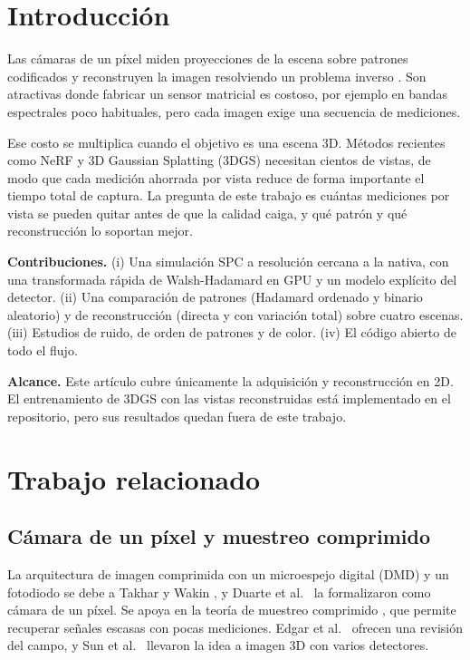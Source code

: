 \documentclass[conference]{IEEEtran}
\begin{document}
\section{Introducción}
Las cámaras de un píxel miden proyecciones de la escena sobre patrones codificados y reconstruyen la imagen resolviendo
un problema inverso \cite{duarte2008,edgar2019}. Son atractivas donde fabricar un sensor matricial es costoso, por
ejemplo en bandas espectrales poco habituales, pero cada imagen exige una secuencia de mediciones.

Ese costo se multiplica cuando el objetivo es una escena 3D. Métodos recientes como NeRF \cite{mildenhall2020} y 3D
Gaussian Splatting (3DGS) \cite{kerbl2023} necesitan cientos de vistas, de modo que cada medición ahorrada por vista
reduce de forma importante el tiempo total de captura. La pregunta de este trabajo es cuántas mediciones por vista se
pueden quitar antes de que la calidad caiga, y qué patrón y qué reconstrucción lo soportan mejor.

\textbf{Contribuciones.} (i) Una simulación SPC a resolución cercana a la nativa, con una transformada rápida de
Walsh-Hadamard en GPU y un modelo explícito del detector. (ii) Una comparación de patrones (Hadamard ordenado y binario
aleatorio) y de reconstrucción (directa y con variación total) sobre cuatro escenas. (iii) Estudios de ruido, de orden
de patrones y de color. (iv) El código abierto de todo el flujo.

\textbf{Alcance.} Este artículo cubre únicamente la adquisición y reconstrucción en 2D. El entrenamiento de 3DGS con
las vistas reconstruidas está implementado en el repositorio, pero sus resultados quedan fuera de este trabajo.

\section{Trabajo relacionado}
\subsection{Cámara de un píxel y muestreo comprimido}
La arquitectura de imagen comprimida con un microespejo digital (DMD) y un fotodiodo se debe a Takhar y Wakin
\cite{takhar2006,wakin2006}, y Duarte et al.\ \cite{duarte2008} la formalizaron como cámara de un píxel. Se apoya en la
teoría de muestreo comprimido \cite{donoho2006,candes2006}, que permite recuperar señales escasas con pocas
mediciones. Edgar et al.\ \cite{edgar2019} ofrecen una revisión del campo, y Sun et al.\ \cite{sun2013} llevaron la
idea a imagen 3D con varios detectores.
\end{document}
